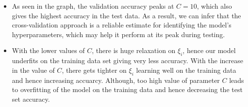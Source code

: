 \documentclass[11pt]{article}
\begin{document}
\begin{itemize}
    \item As seen in the graph, the validation accuracy peaks at $C = 10$, which also gives the highest accuracy in the test data. As a result, we can infer that the cross-validation approach is a reliable estimate for identifying the model's hyperparameters, which may help it perform at its peak during testing.
    \item With the lower values of $C$, there is huge relaxation on $\xi_i$, hence our model underfits on the training data set giving very less accuracy. With the increase in the value of $C$, there gets tighter on $\xi_i$ learning well on the training data and hence increasing accuarcy. Although, too high value of parameter $C$ leads to overfitting of the model on the training data and hence decreasing the test set accuracy.

\end{itemize}
\end{document}
